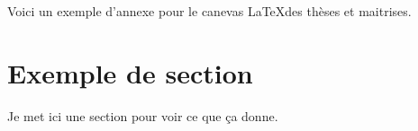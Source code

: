 \addtocounter{chapter}{1}
\setcounter{equation}{0}


Voici un exemple d'annexe pour le canevas \LaTeX des thèses et maitrises.


\section*{Exemple de section}


Je met ici une section pour voir ce que ça donne.

